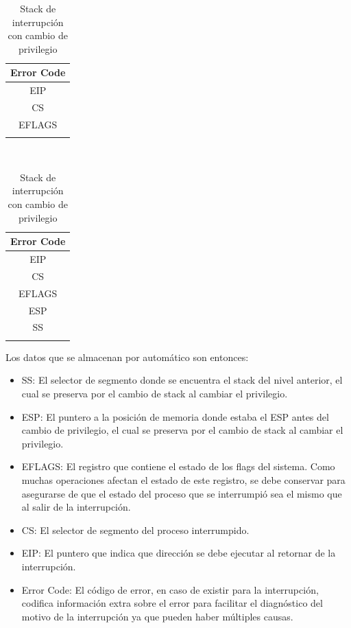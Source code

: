 \documentclass[10pt, a4paper]{article}
\begin{document}
\begin{table}[h]
	\begin{minipage}{0.7\textwidth}
		\hspace*{0.3\textwidth}
		\begin{tabular}{|c|}
			\\ \hline
			Error Code \\ \hline
			EIP \\ \hline
			CS \\ \hline
			EFLAGS \\ \hline
			\\
		\end{tabular}
		\caption{Stack de interrupción sin cambio de privilegio}
	\end{minipage}
	~
	\begin{minipage}{0.7\textwidth}
		\hspace*{0.3\textwidth}
		\begin{tabular}{|c|}
			\\ \hline
			Error Code \\ \hline
			EIP \\ \hline
			CS \\ \hline
			EFLAGS \\ \hline
			ESP \\ \hline
			SS \\ \hline
			\\
		\end{tabular}
		\caption{Stack de interrupción con cambio de privilegio}
	\end{minipage}
\end{table}

Los datos que se almacenan por automático son entonces:
\begin{itemize}
	\item SS: El selector de segmento donde se encuentra el stack del nivel anterior, el cual se preserva por el cambio de stack al cambiar el privilegio.
	\item ESP: El puntero a la posición de memoria donde estaba el ESP antes del cambio de privilegio, el cual se preserva por el cambio de stack al cambiar el privilegio.
	\item EFLAGS: El registro que contiene el estado de los flags del sistema. Como muchas operaciones afectan el estado de este registro, se debe conservar para asegurarse de que el estado del proceso que se interrumpió sea el mismo que al salir de la interrupción.
	\item CS: El selector de segmento del proceso interrumpido.
	\item EIP: El puntero que indica que dirección se debe ejecutar al retornar de la interrupción.
	\item Error Code: El código de error, en caso de existir para la interrupci\'on, codifica información extra sobre el error para facilitar el diagn\'ostico del motivo de la interrupci\'on ya que pueden haber m\'ultiples causas.
\end{itemize}
\end{document}
